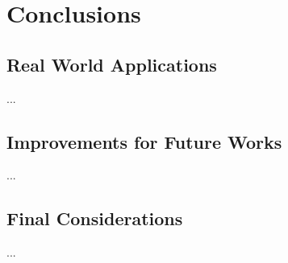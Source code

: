 \section{Conclusions}
\subsection{Real World Applications}
...  

\subsection{Improvements for Future Works}
...  

\subsection{Final Considerations}
...
